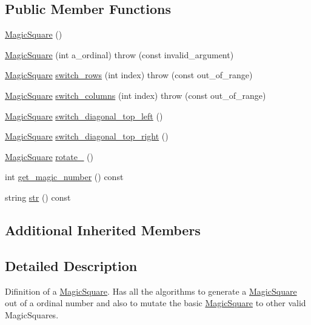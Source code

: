\subsection*{Public Member Functions}
\begin{DoxyCompactItemize}
\item 
\hyperlink{classMagicSquare_ad0c3bd76077df9027cbc7001320546f4}{Magic\-Square} ()
\item 
\hyperlink{classMagicSquare_a44538ecf1867db5ee72f4efa03bae693}{Magic\-Square} (int a\-\_\-ordinal)  throw (const invalid\-\_\-argument)
\item 
\hyperlink{classMagicSquare}{Magic\-Square} \hyperlink{classMagicSquare_a1e8210cf322013adacfb074b0a05cdb7}{switch\-\_\-rows} (int index)  throw (const out\-\_\-of\-\_\-range)
\item 
\hyperlink{classMagicSquare}{Magic\-Square} \hyperlink{classMagicSquare_a6850cf9ba88d20b8a28b9972f020a67a}{switch\-\_\-columns} (int index)  throw (const out\-\_\-of\-\_\-range)
\item 
\hyperlink{classMagicSquare}{Magic\-Square} \hyperlink{classMagicSquare_a3a2c8af100b50506625a8a834a37beb8}{switch\-\_\-diagonal\-\_\-top\-\_\-left} ()
\item 
\hyperlink{classMagicSquare}{Magic\-Square} \hyperlink{classMagicSquare_addc82eb3e9deef9d557a1cb2680b5c1b}{switch\-\_\-diagonal\-\_\-top\-\_\-right} ()
\item 
\hyperlink{classMagicSquare}{Magic\-Square} \hyperlink{classMagicSquare_adbab741c88ad073b2125c5499f7fdca3}{rotate\-\_} ()
\item 
int \hyperlink{classMagicSquare_aff24d6b2c5b224f428db87bf35fa81b7}{get\-\_\-magic\-\_\-number} () const 
\item 
string \hyperlink{classMagicSquare_aa88327706850d00fa8de80b85e7c68c9}{str} () const 
\end{DoxyCompactItemize}
\subsection*{Additional Inherited Members}


\subsection{Detailed Description}
Difinition of a \hyperlink{classMagicSquare}{Magic\-Square}. Has all the algorithms to generate a \hyperlink{classMagicSquare}{Magic\-Square} out of a ordinal number and also to mutate the basic \hyperlink{classMagicSquare}{Magic\-Square} to other valid Magic\-Squares. 

